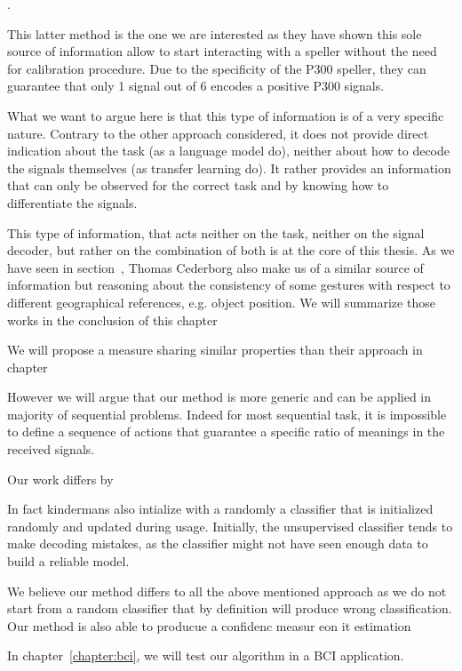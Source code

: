 \cite{Kindermans2012a,Kindermans2012b,tangermann2013zero}.

This latter method is the one we are interested as they have shown this sole source of information allow to start interacting with a speller without the need for calibration procedure. Due to the specificity of the P300 speller, they can guarantee that only 1 signal out of 6 encodes a positive P300 signals.

What we want to argue here is that this type of information is of a very specific nature. Contrary to the other approach considered, it does not provide direct indication about the task (as a language model do), neither about how to decode the signals themselves (as transfer learning do). It rather provides an information that can only be observed for the correct task and by knowing how to differentiate the signals. 

This type of information, that acts neither on the task, neither on the signal decoder, but rather on the combination of both is at the core of this thesis. As we have seen in section~, Thomas Cederborg also make us of a similar source of information but reasoning about the consistency of some gestures with respect to different geographical references, e.g. object position. We will summarize those works in the conclusion of this chapter 




We will propose a measure sharing similar properties than their approach in chapter

However we will argue that our method is more generic and can be applied in majority of sequential problems. Indeed for most sequential task, it is impossible to define a sequence of actions that guarantee a specific ratio of meanings in the received signals. 


Our work differs by

In fact kindermans also intialize with a randomly a classifier
that is initialized randomly and updated during usage. Initially, the unsupervised classifier tends to make decoding mistakes, as the classifier might not have seen enough data to build a reliable model.

\transition

We believe our method differs to all the above mentioned approach as we do not start from a random classifier that by definition will produce wrong classification. Our method is also able to producue a confidenc measur eon it estimation 

In chapter~\ref{chapter:bci}, we will test our algorithm in a BCI application. 


